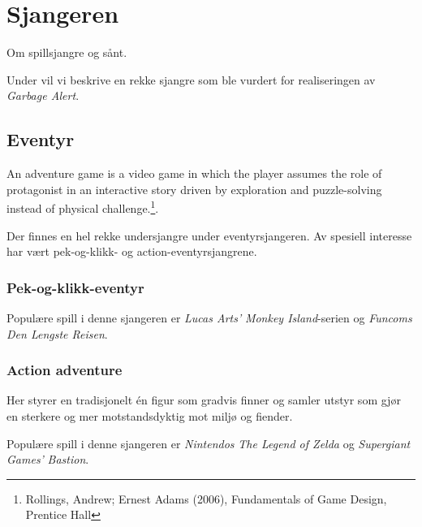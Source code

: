 \section{Sjangeren}\label{sec:sjangre}
Om spillsjangre og sånt.




Under vil vi beskrive en rekke sjangre som ble vurdert for realiseringen av \emph{Garbage Alert}.


\subsection{Eventyr}\label{sec:eventyr}
An adventure game is a video game in which the player assumes the role of protagonist in an interactive story driven by exploration and puzzle-solving instead of physical challenge.\footnote{Rollings, Andrew; Ernest Adams (2006), Fundamentals of Game Design, Prentice Hall}.

Der finnes en hel rekke undersjangre under eventyrsjangeren. Av spesiell interesse har vært pek-og-klikk- og action-eventyrsjangrene.
	
	\subsubsection{Pek-og-klikk-eventyr}


	Populære spill i denne sjangeren er \emph{Lucas Arts'} \emph{Monkey Island}-serien og \emph{Funcoms} \emph{Den Lengste Reisen}.


	\subsubsection{Action adventure}

	Her styrer en tradisjonelt én figur som gradvis finner og samler utstyr som gjør en sterkere og mer motstandsdyktig mot miljø og fiender.


	Populære spill i denne sjangeren er \emph{Nintendos} \emph{The Legend of Zelda} og \emph{Supergiant Games'} \emph{Bastion}.





